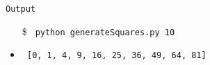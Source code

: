\begin{center}
\texttt{Output}
\end{center}
\begin{itemize}
\item[\$]\texttt{  python generateSquares.py 10 }
\item\texttt{ [0, 1, 4, 9, 16, 25, 36, 49, 64, 81] }
\end{itemize}

